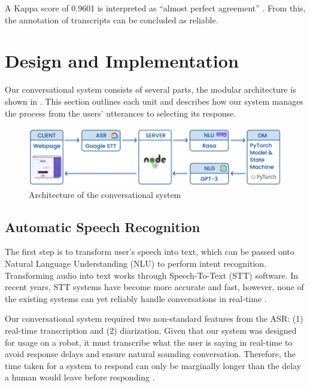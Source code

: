 \documentclass[hidelinks, 11pt]{article}
\begin{document}
\noindent
A Kappa score of 0.9601 is interpreted as ``almost perfect agreement'' \cite{McHugh_2012}. From this, the annotation of transcripts can be concluded as reliable.


\section{Design and Implementation}
\label{sec:implementation}

Our conversational system consists of several parts, the modular architecture is shown in . This section outlines each unit and describes how our system manages the process from the users' utterances to selecting its response.

\begin{figure}
  \includegraphics[width=\textwidth]{images/sys_graph.jpg}
  \caption{Architecture of the conversational system}
  \label{fig:system_architecture}
\end{figure}

\subsection{Automatic Speech Recognition}
\label{subsec:asr}

The first step is to transform user's speech into text, which can be passed onto Natural Language Understanding (NLU) to perform intent recognition. Transforming audio into text works through Speech-To-Text (STT) software. In recent years, STT systems have become more accurate and fast, however, none of the existing systems can yet reliably handle conversations in real-time \cite{addlesee_comprehensive_2020}.

Our conversational system required two non-standard features from the ASR: (1) real-time transcription and (2) diarization. Given that our system was designed for usage on a robot, it must transcribe what the user is saying in real-time to avoid response delays and ensure natural sounding conversation. Therefore, the time taken for a system to respond can only be marginally longer than the delay a human would leave before responding \cite{Miller_1968}.
\end{document}
